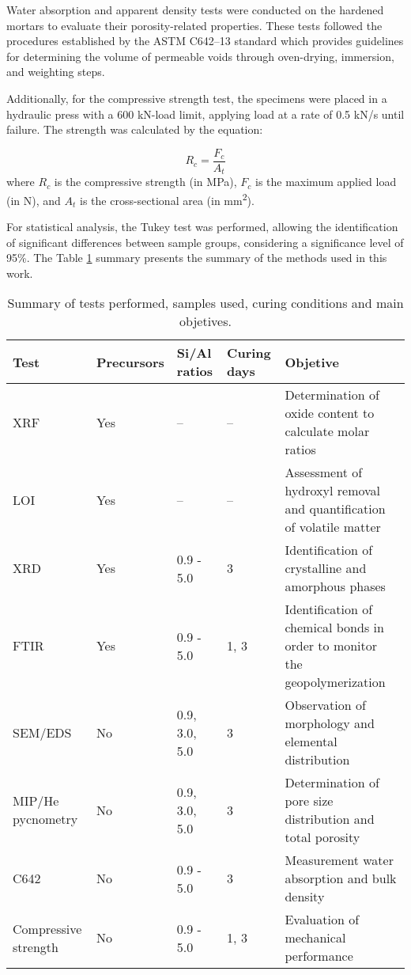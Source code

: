 Water absorption and apparent density tests were conducted on the hardened mortars to evaluate their porosity-related properties. These tests followed the procedures established by the ASTM C642–13 standard \cite{ASTM_C642_2013} which provides guidelines for determining the volume of permeable voids through oven-drying, immersion, and weighting steps. 

Additionally, for the compressive strength test, the specimens were placed in a hydraulic press with  a 600 kN-load limit, applying load at a rate of 0.5 kN/s until failure. The strength was calculated by the equation:

\begin{equation}
    \label{eq:compressive_strength}
    R_c = \frac{F_c}{A_t}
\end{equation}
where $R_c$ is the compressive strength (in MPa), $F_c$ is the maximum applied load (in N), and $A_t$ is the cross-sectional area (in mm\textsuperscript{2}).

For statistical analysis, the Tukey test was performed, allowing the identification of significant differences between sample groups, considering a significance level of 95\%.
The Table \ref{tab:tests_summary} summary presents the summary of the methods used in this work.

\begin{table}[H]
    \centering
    \caption{Summary of tests performed, samples used, curing conditions and main objetives.}
    \label{tab:tests_summary}
    \begin{tabular}{p{2.5cm} p{2cm} p{2.5cm} p{2.5cm} p{4.5cm}}
    \hline
        Test & Precursors & Si/Al ratios & Curing days & Objetive \\
        \hline
        XRF & Yes & -- & -- & Determination of oxide content to calculate molar ratios \\
        LOI & Yes & -- & -- & Assessment of hydroxyl removal and quantification of volatile matter \\
        XRD & Yes & 0.9 - 5.0 & 3 & Identification of crystalline and amorphous phases \\
        FTIR & Yes & 0.9 - 5.0 & 1, 3 & Identification of chemical bonds in order to monitor the geopolymerization \\
        SEM/EDS & No & 0.9, 3.0, 5.0 & 3 & Observation of morphology and elemental distribution \\
        MIP/He pycnometry& No & 0.9, 3.0, 5.0 & 3 & Determination of pore size distribution and total porosity \\
        C642 & No & 0.9 - 5.0 & 3 & Measurement water absorption and bulk density \\
        Compressive strength & No & 0.9 - 5.0 & 1, 3 & Evaluation of mechanical performance \\
        \hline
    \end{tabular}
\end{table}


